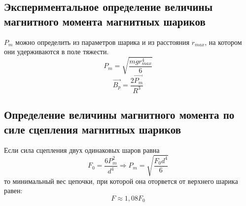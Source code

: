 \documentclass[a4paper, 12pt]{article}%
\begin{document}
\subsection*{Экспериментальное определение величины магнитного момента магнитных шариков}
$P_m$ можно определить из параметров шарика и из расстояния $r_{max}$, на котором они удерживаются в поле тяжести.
\begin{equation}
P_m = \sqrt{\dfrac{mgr_{max}^4}{6}}
\end{equation}
\begin{equation}
\vec{B_p} = \dfrac{2\vec{P_m}}{R^3}
\end{equation}
\subsection*{Определение величины магнитного момента по силе сцепления магнитных шариков}
Если сила сцепления двух одинаковых шаров равна 
\begin{equation}
F_0 = \dfrac{6P_m^2}{d^4} \Rightarrow P_m = \sqrt{\dfrac{F_0d^4}{6}}
\end{equation}
то минимальный вес цепочки, при которой она оторвется от верхнего шарика равен:
\begin{equation}
F \approx 1,08F_0
\end{equation}
\end{document}
